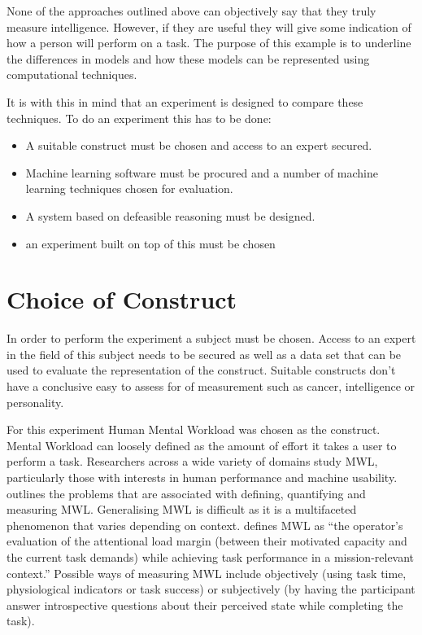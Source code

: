 None of the approaches outlined above can objectively say that they truly measure intelligence. However, if they are useful they will give some indication of how a person will perform on a task. The purpose of this example is to underline the differences in models and how these models can be represented using computational techniques.

It is with this in mind that an experiment is designed to compare these techniques. To do an experiment this has to be done:

\begin{itemize}

  \item A suitable construct must be chosen and access to an expert secured.
  \item Machine learning software must be procured and a number of machine learning techniques chosen for evaluation.
  \item A system based on defeasible reasoning must be designed.
  \item an experiment built on top of this must be chosen 
  
\end{itemize}

\section{Choice of Construct}
\label{sec:choicofc}

In order to perform the experiment a subject must be chosen. Access to an expert in the field of this subject needs to be secured as well as a data set that can be used to evaluate the representation of the construct. Suitable constructs don't have a conclusive easy to assess for of measurement such as  cancer, intelligence or personality. 

For this experiment Human Mental Workload was chosen as the construct. Mental Workload can loosely defined as the amount of effort it takes a user to perform a task. Researchers across a wide variety of domains study MWL, particularly those with interests in human performance and machine usability. \cite{meshkati2011human} outlines the problems that are associated with defining, quantifying and measuring MWL. Generalising MWL is difficult as it is a multifaceted phenomenon that varies depending on context. \cite{meshkati2011human} defines MWL as ``the operator's evaluation of the attentional load margin (between their motivated capacity and the current task demands) while achieving task performance in a mission-relevant context.'' Possible ways of measuring MWL include objectively (using task time, physiological indicators or task success) or subjectively (by having the participant answer introspective questions about their perceived state while completing the task).


